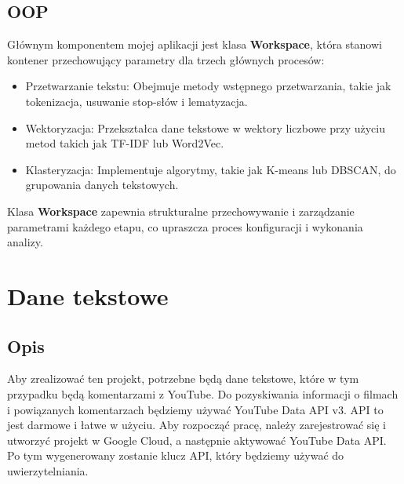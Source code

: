 		
		
	\subsection{OOP}
		Głównym komponentem mojej aplikacji jest klasa \textbf{Workspace}, która stanowi kontener przechowujący parametry dla trzech głównych procesów:
		\begin{itemize}
			\item Przetwarzanie tekstu: Obejmuje metody wstępnego przetwarzania, takie jak tokenizacja, usuwanie stop-słów i lematyzacja.
			\item Wektoryzacja: Przekształca dane tekstowe w wektory liczbowe przy użyciu metod takich jak TF-IDF lub Word2Vec.
			\item Klasteryzacja: Implementuje algorytmy, takie jak K-means lub DBSCAN, do grupowania danych tekstowych.
		\end{itemize}
		Klasa \textbf{Workspace} zapewnia strukturalne przechowywanie i zarządzanie parametrami każdego etapu, co upraszcza proces konfiguracji i wykonania analizy.
		
	
\section{Dane tekstowe}

	\subsection{Opis}
		Aby zrealizować ten projekt, potrzebne będą dane tekstowe, które w tym przypadku będą komentarzami z YouTube. Do pozyskiwania informacji o filmach i powiązanych komentarzach będziemy używać YouTube Data API v3. API to jest darmowe i łatwe w użyciu. Aby rozpocząć pracę, należy zarejestrować się i utworzyć projekt w Google Cloud, a następnie aktywować YouTube Data API. Po tym wygenerowany zostanie klucz API, który będziemy używać do uwierzytelniania.
		
